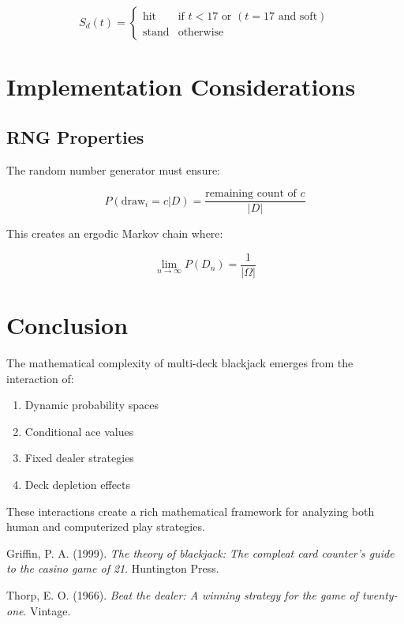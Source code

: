 \documentclass{article}
\begin{document}
\[
S_d(t) =
\begin{cases}
    \text{hit} & \text{if } t < 17 \text{ or } (t = 17 \text{ and soft}) \\
    \text{stand} & \text{otherwise}
\end{cases}
\]

\section{Implementation Considerations}
\subsection{RNG Properties}
The random number generator must ensure:

\[
P(\text{draw}_i = c | D) = \frac{\text{remaining count of } c}{|D|}
\]

This creates an ergodic Markov chain where:

\[
\lim_{n \to \infty} P(D_n) = \frac{1}{|\Omega|}
\]

\section{Conclusion}
The mathematical complexity of multi-deck blackjack emerges from the interaction of:
\begin{enumerate}
    \item Dynamic probability spaces
    \item Conditional ace values
    \item Fixed dealer strategies
    \item Deck depletion effects
\end{enumerate}

These interactions create a rich mathematical framework for analyzing both human and computerized play strategies.

\begin{thebibliography}{9}
 Griffin, P. A. (1999). \textit{The theory of blackjack: The compleat card counter's guide to the casino game of 21}. Huntington Press.

 Thorp, E. O. (1966). \textit{Beat the dealer: A winning strategy for the game of twenty-one}. Vintage.
\end{thebibliography}
\end{document}
